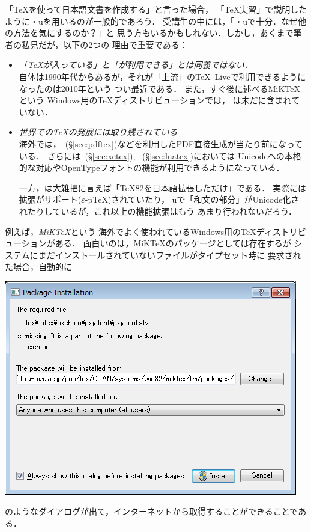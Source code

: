 \documentclass[b5paper]{bxjsarticle} %
\begin{document}
「\TeX を使って日本語文書を作成する」と言った場合，
「\TeX 実習」で説明したように\pTeX ・u\pTeX を用いるのが一般的であろう．
受講生の中には，「\pTeX ・u\pTeX で十分．なぜ他の方法を気にするのか？」と
思う方もいるかもしれない．しかし，あくまで筆者の私見だが，以下の2つの
理由で重要である：
\begin{itemize}
 \item \emph{「\TeX が入っている」と「\pTeX が利用できる」とは同義ではない．}\\
\pTeX 自体は1990年代からあるが，それが「上流」の\TeX~Liveで利用できるようになったのは2010年という
つい最近である．
また，すぐ後に述べるMiK\TeX という
Windows用の\TeX ディストリビューションでは，
\pTeX は未だに含まれていない．
 \item \emph{世界での\TeX の発展に\pTeX は取り残されている}\\
海外では，\pdfTeX~(\S\ref{sec:pdftex})などを利用したPDF直接生成が当たり前になっている．
さらには\XeTeX~(\S\ref{sec:xetex}), \LuaTeX~(\S\ref{sec:luatex})においては
Unicodeへの本格的な対応やOpenTypeフォントの機能が利用できるようになっている．

一方，\pTeX は大雑把に言えば「\TeX82を日本語拡張しただけ」である．
実際には\eTeX 拡張がサポート($\varepsilon$-p\TeX)されていたり，
u\pTeX で「和文の部分」がUnicode化されたりしているが，これ以上の機能拡張はもう
あまり行われないだろう．
\end{itemize}


例えば，\href{https://miktex.org/}{\emph{MiK\TeX}}\>という
海外でよく使われているWindows用の\TeX ディストリビューションがある．
面白いのは，MiK\TeX のパッケージとしては存在するが
システムにまだインストールされていないファイルがタイプセット時に
要求された場合，自動的に
\begin{center}
\includegraphics[scale=0.5]{mik-inst.png}
\end{center}
のようなダイアログが出て，インターネットから取得することができることである．
\end{document}
